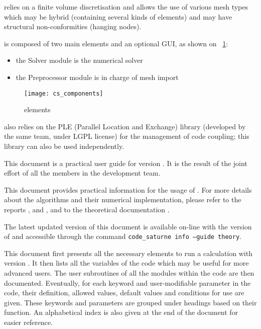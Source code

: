 \CS relies on a finite volume discretisation and allows the use of
various mesh types which may be hybrid (containing several kinds of
elements) and may have structural non-conformities (hanging nodes).


\CS is composed of two main elements and an optional GUI,
as shown on \figurename~\ref{fig:elements}:
\begin{itemize}
\item the Solver module is the numerical solver
\item the Preprocessor module is in charge of mesh import\\
\end{itemize}

\begin{figure}[!h]
\centerline{
\texttt{[image: cs\_components]}}
\caption{\CS elements}\label{fig:elements}
\end{figure}

\indent\CS also relies on the PLE (Parallel Location and Exchange) library (developed by
the same team, under LGPL license) for the management of code coupling;
this library can also be used independently.

This document is a practical user guide for \CS version \verscs.
It is the result of the joint effort of
all the members in the development team.

This document provides practical information for the usage of \CS.
For more details about the algorithms and their numerical implementation,
please refer to the reports
 \cite{ijvf}, \cite{boucker00} and \cite{mechitoua98},
and to the theoretical documentation \cite{theory}.

The latest updated version of this document is available on-line with the version of \CS
and accessible through the command
\texttt{code\_saturne info --guide theory}.

This document first
presents all the necessary elements to run a calculation
with \CS version \verscs. It then lists all the variables of the code
which may be useful for more advanced users.
The user subroutines of all the modules within the code are then documented.
Eventually, for each keyword and user-modifiable parameter in the code,
their definition, allowed values, default values and conditions for use are given.
These keywords and parameters are grouped under headings
based on their function. An alphabetical index is also given at the end of
the document for easier reference.

